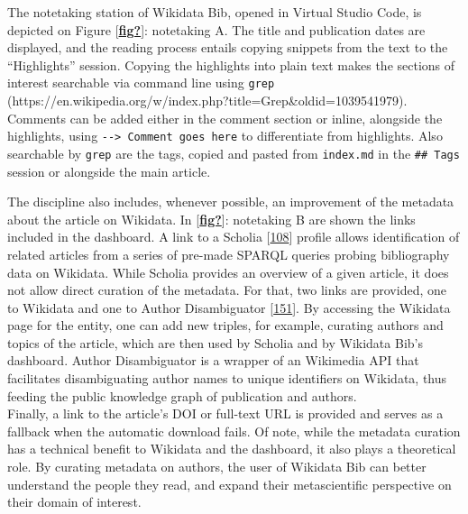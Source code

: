 The notetaking station of Wikidata Bib, opened in Virtual Studio Code, is depicted on Figure {[}\protect\hyperlink{ref-fig}{\textbf{fig?}}{]}: notetaking A.
The title and publication dates are displayed, and the reading process entails copying snippets from the text to the ``Highlights'' session.
Copying the highlights into plain text makes the sections of interest searchable via command line using \texttt{grep} (https://en.wikipedia.org/w/index.php?title=Grep\&oldid=1039541979).
Comments can be added either in the comment section or inline, alongside the highlights, using \texttt{-\/-\textgreater{}\ Comment\ goes\ here} to differentiate from highlights.
Also searchable by \texttt{grep} are the tags, copied and pasted from \texttt{index.md} in the \texttt{\#\#\ Tags} session or alongside the main article.

The discipline also includes, whenever possible, an improvement of the metadata about the article on Wikidata.
In {[}\protect\hyperlink{ref-fig}{\textbf{fig?}}{]}: notetaking B are shown the links included in the dashboard.
A link to a Scholia {[}\protect\hyperlink{ref-hxzL9pmm}{108}{]} profile allows identification of related articles from a series of pre-made SPARQL queries probing bibliography data on Wikidata.
While Scholia provides an overview of a given article, it does not allow direct curation of the metadata.
For that, two links are provided, one to Wikidata and one to Author Disambiguator {[}\protect\hyperlink{ref-1A9RvszKC}{151}{]}.
By accessing the Wikidata page for the entity, one can add new triples, for example, curating authors and topics of the article, which are then used by Scholia and by Wikidata Bib's dashboard.
Author Disambiguator is a wrapper of an Wikimedia API that facilitates disambiguating author names to unique identifiers on Wikidata, thus feeding the public knowledge graph of publication and authors.\\
Finally, a link to the article's DOI or full-text URL is provided and serves as a fallback when the automatic download fails.
Of note, while the metadata curation has a technical benefit to Wikidata and the dashboard, it also plays a theoretical role.
By curating metadata on authors, the user of Wikidata Bib can better understand the people they read, and expand their metascientific perspective on their domain of interest.

